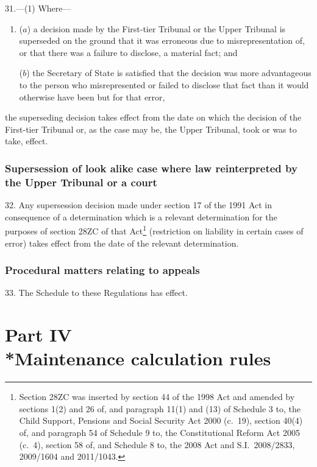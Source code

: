 \documentclass[12pt,a4paper]{article}
\begin{document}
31.---(1)  Where—
\begin{enumerate}\item[]
($a$) a decision made by the First-tier Tribunal or the Upper Tribunal is superseded on the ground that it was erroneous due to misrepresentation of, or that there was a failure to disclose, a material fact; and

($b$) the Secretary of State is satisfied that the decision was more advantageous to the person who misrepresented or failed to disclose that fact than it would otherwise have been but for that error,
\end{enumerate}
the superseding decision takes effect from the date on which the decision of the First-tier Tribunal or, as the case may be, the Upper Tribunal, took or was to take, effect.

\subsubsection[32. Supersession of look alike case where law reinterpreted by the Upper Tribunal or a court]{Supersession of look alike case where law reinterpreted by the Upper Tribunal or a court}

32.  Any supersession decision made under section 17 of the 1991 Act in consequence of a determination which is a relevant determination for the purposes of section 28ZC of that Act\footnote{Section 28ZC was inserted by section 44 of the 1998 Act and amended by sections 1(2) and 26 of, and paragraph 11(1) and (13) of Schedule 3 to, the Child Support, Pensions and Social Security Act 2000 (c.~19), section 40(4) of, and paragraph 54 of Schedule 9 to, the Constitutional Reform Act 2005 (c.~4), section 58 of, and Schedule 8 to, the 2008 Act and S.I.~2008/2833, 2009/1604 and 2011/1043.} (restriction on liability in certain cases of error) takes effect from the date of the relevant determination.

\subsubsection[33. Procedural matters relating to appeals]{Procedural matters relating to appeals}

33.  The Schedule to these Regulations has effect.

\section[Part IV --- Maintenance calculation rules]{Part IV\\*Maintenance calculation rules}
\end{document}
